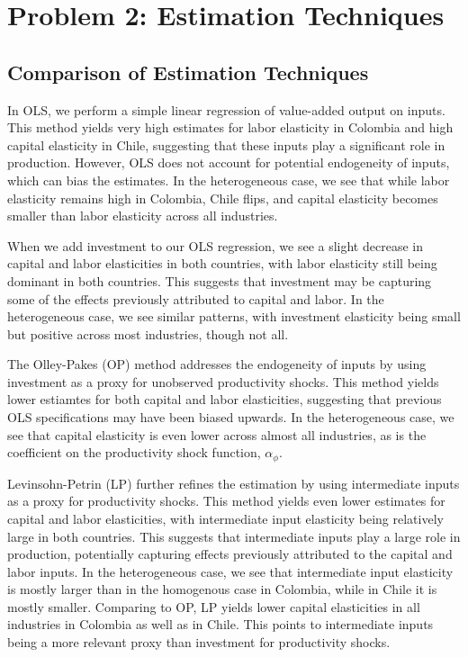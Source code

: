 \documentclass{article}
\begin{document}
\section*{Problem 2: Estimation Techniques}

\subsection*{Comparison of Estimation Techniques}

In OLS, we perform a simple linear regression of value-added output on inputs. This method yields very high estimates for labor elasticity in Colombia and high capital
elasticity in Chile, suggesting that these inputs play a significant role in production. However, OLS does not account for potential endogeneity of inputs, which can bias the estimates.
In the heterogeneous case, we see that while labor elasticity remains high in Colombia, Chile flips, and capital elasticity becomes smaller than labor elasticity across all industries.

When we add investment to our OLS regression, we see a slight decrease in capital and labor elasticities in both countries, with labor elasticity still being dominant in both countries.
This suggests that investment may be capturing some of the effects previously attributed to capital and labor. In the heterogeneous case, we see similar patterns, with investment 
elasticity being small but positive across most industries, though not all.

The Olley-Pakes (OP) method addresses the endogeneity of inputs by using investment as a proxy for unobserved productivity shocks. This method yields lower estiamtes for both capital and labor elasticities,
suggesting that previous OLS specifications may have been biased upwards. In the heterogeneous case, we see that capital elasticity is even lower across almost all industries, as is the coefficient on the 
productivity shock function, $\alpha_{\phi}$.

Levinsohn-Petrin (LP) further refines the estimation by using intermediate inputs as a proxy for productivity shocks. This method yields even lower estimates for capital and labor elasticities, with
intermediate input elasticity being relatively large in both countries. This suggests that intermediate inputs play a large role in production, potentially capturing effects previously attributed
to the capital and labor inputs. In the heterogeneous case, we see that intermediate input elasticity is mostly larger than in the homogenous case in Colombia, while in Chile it is mostly smaller. 
Comparing to OP, LP yields lower capital elasticities in all industries in Colombia as well as in Chile. This points to intermediate inputs being a more relevant proxy than investment for productivity
shocks.
\end{document}
